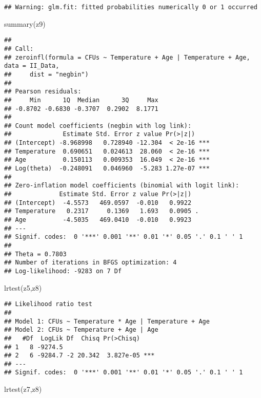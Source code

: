 \documentclass[
]{article}
\newenvironment{Shaded}{\begin{snugshade}}{\end{snugshade}}
\newcommand{\FunctionTok}[1]{\textcolor[rgb]{0.00,0.00,0.00}{#1}}
\newcommand{\NormalTok}[1]{#1}
\begin{document}
\begin{verbatim}
## Warning: glm.fit: fitted probabilities numerically 0 or 1 occurred
\end{verbatim}

\begin{Shaded}
\begin{Highlighting}[]
\FunctionTok{summary}\NormalTok{(z9)}
\end{Highlighting}
\end{Shaded}

\begin{verbatim}
## 
## Call:
## zeroinfl(formula = CFUs ~ Temperature + Age | Temperature + Age, data = II_Data, 
##     dist = "negbin")
## 
## Pearson residuals:
##     Min      1Q  Median      3Q     Max 
## -0.8702 -0.6830 -0.3707  0.2902  8.1771 
## 
## Count model coefficients (negbin with log link):
##              Estimate Std. Error z value Pr(>|z|)    
## (Intercept) -8.968998   0.728940 -12.304  < 2e-16 ***
## Temperature  0.690651   0.024613  28.060  < 2e-16 ***
## Age          0.150113   0.009353  16.049  < 2e-16 ***
## Log(theta)  -0.248091   0.046960  -5.283 1.27e-07 ***
## 
## Zero-inflation model coefficients (binomial with logit link):
##             Estimate Std. Error z value Pr(>|z|)  
## (Intercept)  -4.5573   469.0597  -0.010   0.9922  
## Temperature   0.2317     0.1369   1.693   0.0905 .
## Age          -4.5035   469.0410  -0.010   0.9923  
## ---
## Signif. codes:  0 '***' 0.001 '**' 0.01 '*' 0.05 '.' 0.1 ' ' 1 
## 
## Theta = 0.7803 
## Number of iterations in BFGS optimization: 4 
## Log-likelihood: -9283 on 7 Df
\end{verbatim}

\begin{Shaded}
\begin{Highlighting}[]
\FunctionTok{lrtest}\NormalTok{(z5,z8) }
\end{Highlighting}
\end{Shaded}

\begin{verbatim}
## Likelihood ratio test
## 
## Model 1: CFUs ~ Temperature * Age | Temperature + Age
## Model 2: CFUs ~ Temperature + Age | Age
##   #Df  LogLik Df  Chisq Pr(>Chisq)    
## 1   8 -9274.5                         
## 2   6 -9284.7 -2 20.342  3.827e-05 ***
## ---
## Signif. codes:  0 '***' 0.001 '**' 0.01 '*' 0.05 '.' 0.1 ' ' 1
\end{verbatim}

\begin{Shaded}
\begin{Highlighting}[]
\FunctionTok{lrtest}\NormalTok{(z7,z8) }
\end{Highlighting}
\end{Shaded}
\end{document}
